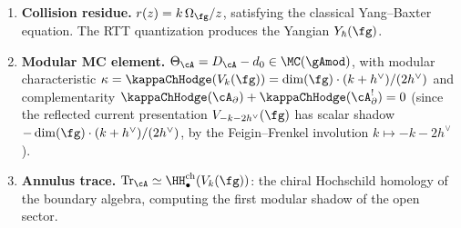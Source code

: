 \begin{theorem}
\begin{enumerate}[label=\textup{(\roman*)},nosep]
\item \textbf{Collision residue.}
 $r(z) = k\,\Omega_\fg / z$, satisfying the classical Yang--Baxter
 equation. The RTT quantization produces the Yangian $Y_\hbar(\fg)$.

\item \textbf{Modular MC element.}
 $\Theta_\cA = D_\cA - d_0 \in \MC(\gAmod)$, with modular
 characteristic $\kappa = \kappaChHodge(V_k(\fg))
 = \dim(\fg)\cdot(k + h^\vee)/(2h^\vee)$ and complementarity
 $\kappaChHodge(\cA_\partial) + \kappaChHodge(\cA_\partial^!) = 0$
 \textup{(}since the reflected current presentation
 $V_{-k-2h^\vee}(\fg)$ has scalar shadow
 $-\dim(\fg)\cdot(k+h^\vee)/(2h^\vee)$, by the
 Feigin--Frenkel involution $k \mapsto -k-2h^\vee$\textup{)}.

\item \textbf{Annulus trace.}
 $\operatorname{Tr}_\cA \simeq \HH^{\mathrm{ch}}_\bullet(V_k(\fg))$: the
 chiral Hochschild homology of the boundary algebra, computing the
 first modular shadow of the open sector.
\end{enumerate}
\end{theorem}

